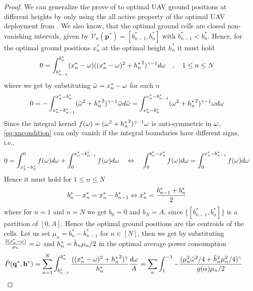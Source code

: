 \documentclass[smallabstract,smallcaptions]{dccpaper}
\newif\ifproof\prooffalse %
\renewcommand{\vq}{\mathbf p}
\renewcommand{\vp}{\mathbf q}
\newcommand{\Pbar}{\ensuremath{\bar{P}}}         %
\newcommand{\Vor}{\ensuremath{\mathcal{V}}}         %
\begin{document}
\ifproof
\begin{proof}
  We can generalize the prove of  to optimal UAV ground positions at different heights by only
  using the all active property of the optimal UAV deployment from  . We also know, that the
  optimal ground cells are closed non-vanishing intervals, given by $\Vor_n(\vq^*)=[b_{n-1}^*,b_n^*]$ with
  $b^*_{n-1}<b_n^*$.  Hence, for the optimal ground positions $x_n^*$ at the optimal height $h_n^*$ it must hold 
  \begin{align}
    0 = \int^{b^*_n}_{b_{n-1}^*} (x_n^*-\omega) ((x_n^*-\omega)^2+{h^{*}_n}^2)^{\gamma-1}d\omega \quad,\quad 1\leq n\leq
    N\label{eq:vornx_diffh}
  \end{align}
  where we get by substituting ${  \tilde{\omega} }=x_n^*-\omega$ for each $n$ 
  \begin{align}
    0=-\int_{x_n^*-b^*_{n-1}}^{x^*_n-b^*_{n}} ({  \tilde{\omega} }^2+{h^{*}_n}^2)^{\gamma-1}{  \tilde{\omega} } d{  \tilde{\omega} } 
    =\int_{x_n^*-b^*_{n}}^{x_n^*-b^*_{n-1}} (\omega^2+{h^{*}_n}^2)^{\gamma-1}\omega d\omega\label{eq:xncondition}
  \end{align}
  Since the integral kernel $f(\omega)=(\omega^2+{h^{*}_n}^2)^{\gamma-1}\omega$ is  anti-symmetric in $\omega$,
  \eqref{eq:xncondition} can only vanish if the integral boundaries have different signs, i.e.,
  \begin{align}
    0= \int_{x_n^*-b_{n}^*}^0 f(\omega)d\omega + \int_0^{x_n^*-b_{n-1}^*} f(\omega)d\omega 
    \quad    \Leftrightarrow \quad
        \int_0^{b^*_n-x_n^*} f(\omega)d\omega = \int_0^{x_n^*-b^*_{n-1}}f(\omega)d\omega 
        \notag
  \end{align}
  Hence it must hold  for $1\leq n\leq N$
  \begin{align}
    b^*_{n} -{x^{*}_n}={x^{*}_n}-b^*_{n-1} \Leftrightarrow  {\ensuremath{x^{*}}_n}=\frac{b_{n-1}^*+b_{n}^*}{2}\label{eq:bnoptimal}
  \end{align}
  where for $n=1$ and $n=N$ we get $b_0=0$ and $b_N=A$, since $\{[b^*_{n-1},b_n^*]\}$ is a partition of $[0,A]$. Hence
  the optimal ground positions are the centroids of the cells.  Let us set $\mu_n=b_n^*-b_{n-1}^*$ for $n\in[N]$, then
  we get by substituting $\frac{2(x_n^*-\omega)}{\mu_n}={  \tilde{\omega} }$ and $h^{*}_n=\tilde{h}_n\mu_n/2$  in the optimal average power
  consumption
  \begin{align}
    \Pbar(\vp^*,\vh^*)&=\sum_{n=1}^N \int_{b_{n-1}^*}^{b_n^*} \frac{ ((\pGlob_n-\ome)^2+{\hGlob_n}^2)^{\gam}}{\hGlob_n}\frac{d\ome}{A} 
    = \sum_n \int_{1}^{-1} -\frac{  (\mu_n^2 \tome^2/4 + \tilde{h}_n^2\mu_n^2/4)^{\gam}}{g(\alp)\mu_n/2}

\end{align}
\end{proof}
\end{document}
